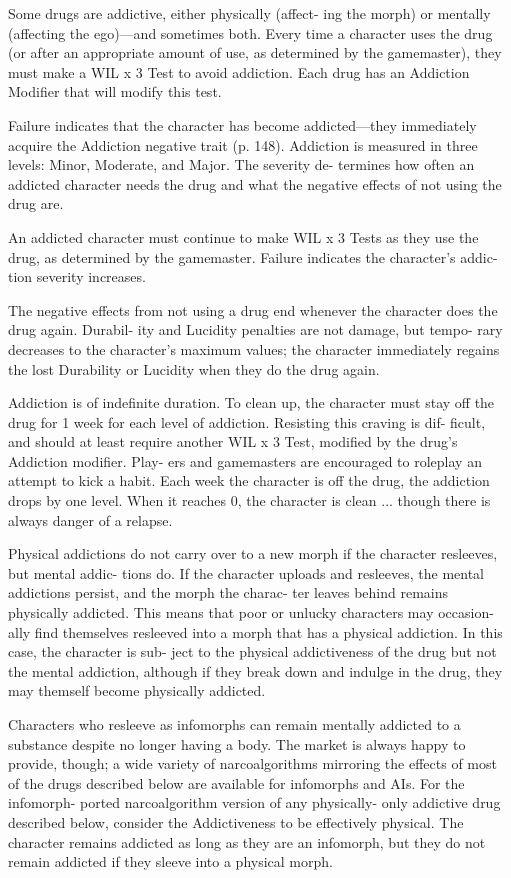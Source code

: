 Some drugs are addictive, either physically (affect-
ing the morph) or mentally (affecting the ego)—and 
sometimes both. Every time a character uses the drug 
(or after an appropriate amount of use, as determined 
by the gamemaster), they must make a WIL x 3 Test to 
avoid addiction. Each drug has an Addiction Modifier 
that will modify this test.

Failure indicates that the character has become 
addicted—they immediately acquire the Addiction 
negative trait (p. 148). Addiction is measured in three 
levels: Minor, Moderate, and Major. The severity de-
termines how often an addicted character needs the 
drug and what the negative effects of not using the 
drug are.

An addicted character must continue to make WIL 
x 3 Tests as they use the drug, as determined by the 
gamemaster. Failure indicates the character's addic-
tion severity increases.

The negative effects from not using a drug end 
whenever the character does the drug again. Durabil-
ity and Lucidity penalties are not damage, but tempo-
rary decreases to the character's maximum values; the 
character immediately regains the lost Durability or 
Lucidity when they do the drug again.

Addiction is of indefinite duration. To clean up, 
the character must stay off the drug for 1 week for 
each level of addiction. Resisting this craving is dif-
ficult, and should at least require another WIL x 3 
Test, modified by the drug's Addiction modifier. Play-
ers and gamemasters are encouraged to roleplay an 
attempt to kick a habit. Each week the character is 
off the drug, the addiction drops by one level. When 
it reaches 0, the character is clean ... though there is 
always danger of a relapse.

Physical addictions do not carry over to a new 
morph if the character resleeves, but mental addic-
tions do. If the character uploads and resleeves, the 
mental addictions persist, and the morph the charac-
ter leaves behind remains physically addicted. This 
means that poor or unlucky characters may occasion-
ally find themselves resleeved into a morph that has a 
physical addiction. In this case, the character is sub-
ject to the physical addictiveness of the drug but not 
the mental addiction, although if they break down 
and indulge in the drug, they may themself become 
physically addicted.

Characters who resleeve as infomorphs can remain 
mentally addicted to a substance despite no longer 
having a body. The market is always happy to provide, 
though; a wide variety of narcoalgorithms mirroring 
the effects of most of the drugs described below are 
available for infomorphs and AIs. For the infomorph-
ported narcoalgorithm version of any physically-
only addictive drug described below, consider the 
Addictiveness to be effectively physical. The character 
remains addicted as long as they are an infomorph, 
but they do not remain addicted if they sleeve into a 
physical morph.


